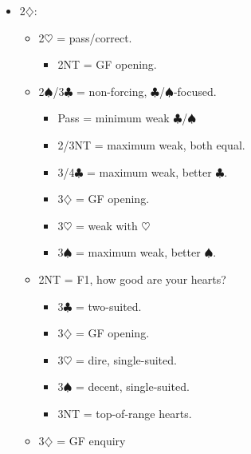 \documentclass[a4paper,14pt]{extarticle}
\begin{document}
\begin{itemize}
\item 2$\diamondsuit$:
	\begin{itemize}
   \item 2$\heartsuit$ = pass/correct.
		\begin{itemize}
      \item 2NT = GF opening.
		\end{itemize}
   \item 2$\spadesuit$/3$\clubsuit$ = non-forcing, $\clubsuit$/$\spadesuit$-focused.
		\begin{itemize}
		\item Pass = minimum weak $\clubsuit$/$\spadesuit$
      \item 2/3NT = maximum weak, both equal.
      \item 3/4$\clubsuit$ = maximum weak, better $\clubsuit$.
      \item 3$\diamondsuit$ = GF opening.
      \item 3$\heartsuit$ = weak with $\heartsuit$
      \item 3$\spadesuit$ = maximum weak, better $\spadesuit$.
		\end{itemize}
   \item 2NT = F1, how good are your hearts?
		\begin{itemize}
      \item 3$\clubsuit$ = two-suited.
      \item 3$\diamondsuit$ = GF opening.
      \item 3$\heartsuit$ = dire, single-suited.
      \item 3$\spadesuit$ = decent, single-suited.
      \item 3NT = top-of-range hearts.
		\end{itemize}
	\item 3$\diamondsuit$ = GF enquiry
	\end{itemize}

\newpage


\end{itemize}
\end{document}
